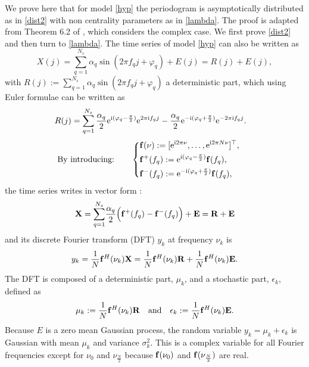\documentclass[journal]{IEEEtran}
\begin{document}
 We prove  here that for model \eqref{hyp} the periodogram is asymptotically distributed as in \eqref{dist2} with non centrality parameters as in \eqref{lambda}.
 The proof is adapted from Theorem 6.2 of \cite{Li_2014}, which considers the complex case.
  We first prove \eqref{dist2} and then turn to  \eqref{lambda}. The time series of model \eqref{hyp} can also be written as
$$
X(j)  =  \sum_{q = 1}^{N_s} \alpha_q \sin(2\pi f_q j+\varphi_q)+ E(j)= R(j)+E(j),
$$
with $R(j):=   \sum_{q=1}^{N_s}  \alpha_q \sin(2\pi  f_q j + \varphi_q)$ a deterministic part, which using Euler formulae 
can  be written as
$$
      \begin{aligned}
	R(j)  	     &=  \sum_{q=1}^{N_s} \frac{ \alpha_q}{2}  \mathrm{e}^{{\rm{i}} (\varphi_q-\frac{\pi}{2})} \mathrm{e}^{2\pi {\rm{i}} f_q j } -  \frac{ \alpha_q}{2}  \mathrm{e}^{-{\rm{i}} (\varphi_q+\frac{\pi}{2})} \mathrm{e}^{-2\pi {\rm{i}} f_q j}.
     \end{aligned}
     \vspace{-0.3cm}
 $$
$$
\vspace{-0.2cm}
\!\!\!\!\!\! \!\! \text{By introducing:}~~~~~~
	\left\{
      \begin{aligned}
      		& {\bf{f}}(\nu):=[\mathrm{e}^{{\rm{i}}2\pi \nu},\hdots, \mathrm{e}^{{\rm{i}}2\pi N\nu}]^\top,\\
		&{\bf{f}}^{+}(f_q)
		:=\mathrm{e}^{{\rm{i}} (\varphi_q-\frac{\pi}{2})}  {\bf{f}}(f_q), \\
		&{\bf{f}}^{-}(f_q):=
		\mathrm{e}^{-{\rm{i}} (\varphi_q+\frac{\pi}{2})}  {\bf{f}}(f_q),
     \end{aligned}
     \right.
$$
the time series  writes in vector form :
\begin{equation}
      \begin{aligned}
	{\bf{X}} &=   \displaystyle{\sum_{q=1}^{N_s}} \frac{\alpha_q}{2} \Big( {{{\bf{f}^{+}}(f_q)} -  {{\bf{f}^{-}}(f_q)}}  \Big)+ {\bf{E}}={\bf{R}}+ {\bf{E}} \\
  \end{aligned}
  \label{RE}
\end{equation}
and its discrete Fourier transform (DFT) $y_k$ at frequency $\nu_k$ { is}
$$
	y_k=\frac{1}{N}  {\bf{f}}^H(\nu_k){\bf{X}} = \frac{1}{N}  {\bf{f}}^H(\nu_k){\bf{R}} + \frac{1}{N}  {\bf{f}}^H(\nu_k){\bf{E}}.
$$
The DFT is composed of a deterministic part, ${\mu_k}$, and a stochastic part, ${\epsilon}_k$, defined as
\begin{equation}
	{\mu_k}:= \frac{1}{N} {\bf{f}}^H(\nu_k){\bf{R}}\quad{\textrm{and}}\quad {\epsilon}_k:= \frac{1}{N} {\bf{f}}^H(\nu_k)\bf{E}.
	\label{mu}
\end{equation}
 Because $E$ is a zero mean Gaussian process, the random variable $y_k=\mu_k+\epsilon_k$ is Gaussian with mean $\mu_k$ and variance $\sigma^2_k$. This is a complex variable for all Fourier frequencies except for $\nu_0$ and $\nu_{\frac{N}{2}}$ because $ {\bf{f}}(\nu_0)$ and $ {\bf{f}}(\nu_{\frac{N}{2}})$ are real.
\end{document}
